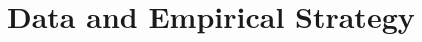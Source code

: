 \documentclass[xcolor=dvipsnames, aspectratio=169]{beamer}
\begin{document}



\section{Data and Empirical Strategy}
\end{document}

